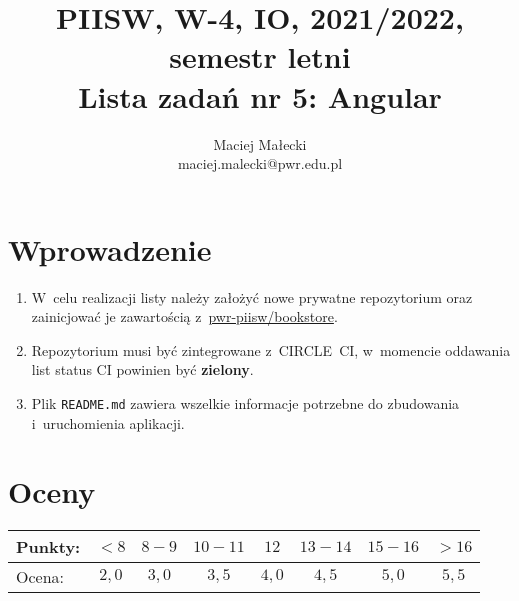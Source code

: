 \documentclass[12pt]{article}
\title{PIISW, W-4, IO, 2021/2022, semestr letni\\Lista zadań nr 5: Angular}
\author{Maciej Małecki\\ \small maciej.malecki@pwr.edu.pl}
\begin{document}
    \maketitle

    \section*{Wprowadzenie}
        \begin{enumerate}
            \item W~celu realizacji listy należy założyć nowe prywatne repozytorium oraz zainicjować je zawartością z~\href{https://github.com/pwr-piisw/bookstore}{pwr-piisw/bookstore}.
			\item Repozytorium musi być zintegrowane z~CIRCLE~CI, w~momencie oddawania list status CI powinien być \textbf{zielony}.
			\item Plik \texttt{README.md} zawiera wszelkie informacje potrzebne do zbudowania i~uruchomienia aplikacji.
        \end{enumerate}

    \section*{Oceny}
    \begin{tabular}{|l|c|c|c|c|c|c|c|}
        \hline
        Punkty: & $<8$ & $8-9$ & $10-11$ & $12$ & $13-14$ & $15-16$ & $>16$ \\
        \hline
        Ocena:  & $2,0$ & $3,0$ & $3,5$ & $4,0$ & $4,5$ & $5,0$ & $5,5$ \\
        \hline
    \end{tabular}
\end{document}
